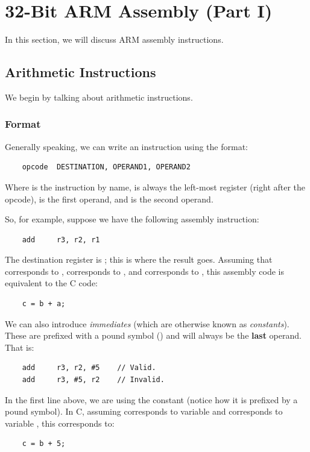 \documentclass[letterpaper]{article}
\begin{document}
\newpage 

\section{32-Bit ARM Assembly (Part I)}
In this section, we will discuss ARM assembly instructions.

\subsection{Arithmetic Instructions}
We begin by talking about arithmetic instructions.

\subsubsection{Format}
Generally speaking, we can write an instruction using the format:
\begin{verbatim}
    opcode  DESTINATION, OPERAND1, OPERAND2
\end{verbatim}
Where  is the instruction by name,  is always the left-most register (right after the opcode),  is the first operand, and  is the second operand. 

\bigskip 

So, for example, suppose we have the following assembly instruction:
\begin{verbatim}
    add     r3, r2, r1
\end{verbatim}
The destination register is ; this is where the result goes. Assuming that  corresponds to ,  corresponds to , and  corresponds to , this assembly code is equivalent to the C code:
\begin{verbatim}
    c = b + a;
\end{verbatim}
We can also introduce \emph{immediates} (which are otherwise known as \emph{constants}). These are prefixed with a pound symbol (\code{\#}) and will always be the \textbf{last} operand. That is:
\begin{verbatim}
    add     r3, r2, #5    // Valid. 
    add     r3, #5, r2    // Invalid.
\end{verbatim}
In the first line above, we are using the constant  (notice how it is prefixed by a pound symbol). In C, assuming  corresponds to variable  and  corresponds to variable , this corresponds to:
\begin{verbatim}
    c = b + 5; 
\end{verbatim}
\end{document}
